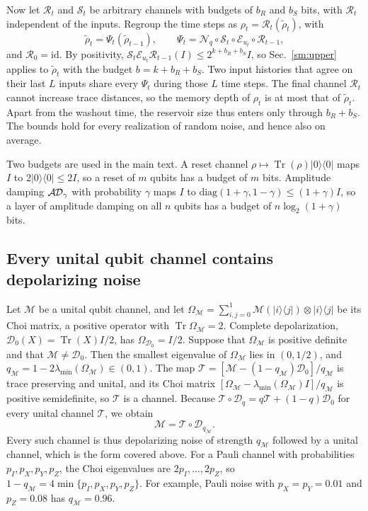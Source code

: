 \documentclass[aps,prl,twocolumn,superscriptaddress,floatfix]{revtex4-2}
\theoremstyle{plain}
\newcommand{\tr}{\operatorname{Tr}}
\newcommand{\ketbra}[2]{|#1\rangle\!\langle #2|}
\newcommand{\cD}{\mathcal D}
\newcommand{\cE}{\mathcal E}
\newcommand{\Nq}{\mathcal N_q}
\newcommand{\AD}{\mathcal{A\hspace{-0.6pt}D}}
\begin{document}
Now let $\mathcal R_t$ and $\mathcal S_t$ be arbitrary channels with budgets of $b_R$ and $b_S$ bits, with $\mathcal R_t$ independent of the inputs. Regroup the time steps as $\rho_t=\mathcal R_t(\tilde\rho_t)$, with
\begin{equation}
\tilde\rho_t=\Psi_t(\tilde\rho_{t-1}),\qquad\Psi_t=\Nq\circ\mathcal S_t\circ\cE_{u_t}\circ\mathcal R_{t-1},
\end{equation}
and $\mathcal R_0=\mathrm{id}$. By positivity, $\mathcal S_t\cE_{u_t}\mathcal R_{t-1}(I)\le2^{k+b_R+b_S}I$, so Sec.~\ref{sm:upper} applies to $\tilde\rho_t$ with the budget $b=k+b_R+b_S$. Two input histories that agree on their last $L$ inputs share every $\Psi_t$ during those $L$ time steps. The final channel $\mathcal R_t$ cannot increase trace distances, so the memory depth of $\rho_t$ is at most that of $\tilde\rho_t$. Apart from the washout time, the reservoir size thus enters only through $b_R+b_S$. The bounds hold for every realization of random noise, and hence also on average.

Two budgets are used in the main text. A reset channel $\rho\mapsto\tr(\rho)\ketbra00$ maps $I$ to $2\ketbra00\le2I$, so a reset of $m$ qubits has a budget of $m$ bits. Amplitude damping $\AD_\gamma$ with probability $\gamma$ maps $I$ to $\mathrm{diag}(1+\gamma,1-\gamma)\le(1+\gamma)I$, so a layer of amplitude damping on all $n$ qubits has a budget of $n\log_2(1+\gamma)$ bits.

\subsection{Every unital qubit channel contains depolarizing noise}

Let $\mathcal M$ be a unital qubit channel, and let $\Omega_{\mathcal M}=\sum_{i,j=0}^1\mathcal M(\ketbra ij)\otimes\ketbra ij$ be its Choi matrix, a positive operator with $\tr\Omega_{\mathcal M}=2$. Complete depolarization, $\cD_0(X)=\tr(X)I/2$, has $\Omega_{\cD_0}=I/2$. Suppose that $\Omega_{\mathcal M}$ is positive definite and that $\mathcal M\ne\cD_0$. Then the smallest eigenvalue of $\Omega_{\mathcal M}$ lies in $(0,1/2)$, and $q_{\mathcal M}=1-2\lambda_{\min}(\Omega_{\mathcal M})\in(0,1)$. The map $\mathcal T=[\mathcal M-(1-q_{\mathcal M})\cD_0]/q_{\mathcal M}$ is trace preserving and unital, and its Choi matrix $[\Omega_{\mathcal M}-\lambda_{\min}(\Omega_{\mathcal M})I]/q_{\mathcal M}$ is positive semidefinite, so $\mathcal T$ is a channel. Because $\mathcal T\circ\cD_q=q\mathcal T+(1-q)\cD_0$ for every unital channel $\mathcal T$, we obtain
\begin{equation}
\mathcal M=\mathcal T\circ\cD_{q_{\mathcal M}} .
\end{equation}
Every such channel is thus depolarizing noise of strength $q_{\mathcal M}$ followed by a unital channel, which is the form covered above. For a Pauli channel with probabilities $p_I,p_X,p_Y,p_Z$, the Choi eigenvalues are $2p_I,\dots,2p_Z$, so $1-q_{\mathcal M}=4\min\{p_I,p_X,p_Y,p_Z\}$. For example, Pauli noise with $p_X=p_Y=0.01$ and $p_Z=0.08$ has $q_{\mathcal M}=0.96$.
\end{document}
